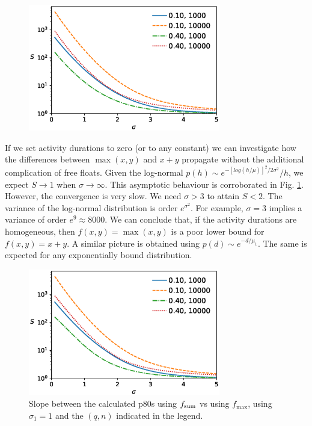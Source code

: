\documentclass[reprint,aps,prl,amsmath,amssymb,superscriptaddress,showpacs]{revtex4-1}
\begin{document}
\begin{figure}[t]
\includegraphics[width=3.3in]{maxsum.scheduling.dupsplit.arc_distribution_zero.eps}
\caption{}
\label{fig1}
\end{figure}

If we set activity durations to zero (or to any constant) we can investigate how the differences between $\max(x,y)$ and $x+y$ propagate without the additional complication of free floats. Given the log-normal $p(h)\sim e^{-[log(h/\mu)]^2/2\sigma^2}/h$, we expect $S\rightarrow1$ when $\sigma\rightarrow\infty$. This asymptotic behaviour is corroborated in Fig. \ref{fig1}. However, the convergence is very slow. We need $\sigma>3$ to attain $S<2$. The variance of the log-normal distribution is order $e^{\sigma^2}$. For example, $\sigma=3$ implies a variance of order $e^9\approx 8000$. We can conclude that, if the activity durations are homogeneous, then $f(x,y)=\max(x,y)$ is a poor lower bound for $f(x,y)=x+y$. A similar picture is obtained using $p(d)\sim e^{-d/\mu_1}$. The same is expected for any exponentially bound distribution.

\begin{figure}[t]
\includegraphics[width=3.3in]{maxsum.scheduling.dupsplit.arc_distribution_lognormal.arc_sigma_1.eps}
\caption{Slope between the calculated p80s using $f_{\rm sum}$ vs using $f_{\max}$, using $\sigma_1=1$ and the $(q,n)$ indicated in the legend. }
\label{fig2}
\end{figure}
\end{document}
